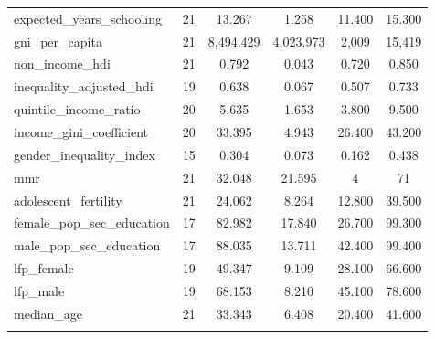 \begin{table}[!htbp]
\begin{tabular}{@{\extracolsep{5pt}}lccccc}
expected\_years\_schooling & 21 & 13.267 & 1.258 & 11.400 & 15.300 \\ 
gni\_per\_capita & 21 & 8,494.429 & 4,023.973 & 2,009 & 15,419 \\ 
non\_income\_hdi & 21 & 0.792 & 0.043 & 0.720 & 0.850 \\ 
inequality\_adjusted\_hdi & 19 & 0.638 & 0.067 & 0.507 & 0.733 \\ 
quintile\_income\_ratio & 20 & 5.635 & 1.653 & 3.800 & 9.500 \\ 
income\_gini\_coefficient & 20 & 33.395 & 4.943 & 26.400 & 43.200 \\ 
gender\_inequality\_index & 15 & 0.304 & 0.073 & 0.162 & 0.438 \\ 
mmr & 21 & 32.048 & 21.595 & 4 & 71 \\ 
adolescent\_fertility & 21 & 24.062 & 8.264 & 12.800 & 39.500 \\ 
female\_pop\_sec\_education & 17 & 82.982 & 17.840 & 26.700 & 99.300 \\ 
male\_pop\_sec\_education & 17 & 88.035 & 13.711 & 42.400 & 99.400 \\ 
lfp\_female & 19 & 49.347 & 9.109 & 28.100 & 66.600 \\ 
lfp\_male & 19 & 68.153 & 8.210 & 45.100 & 78.600 \\ 
median\_age & 21 & 33.343 & 6.408 & 20.400 & 41.600 \\ 
\hline \\[-1.8ex] 
\end{tabular} 
\end{table} 
